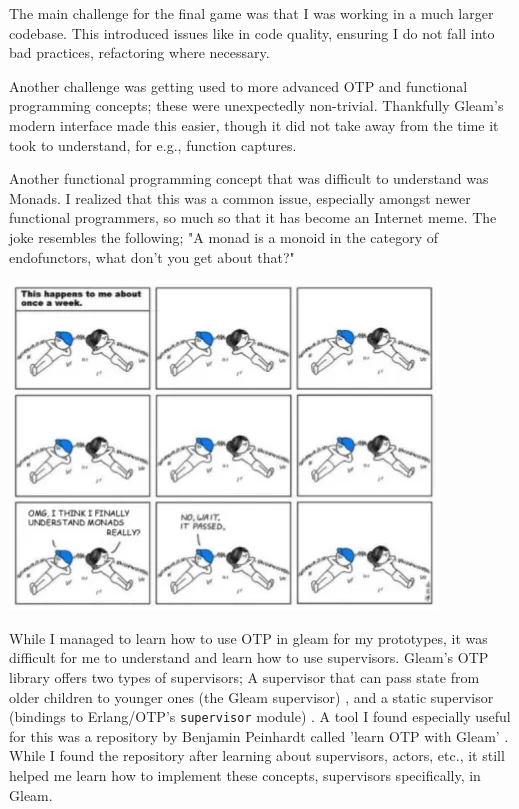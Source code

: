 \documentclass[]{final}
\begin{document}
The main challenge for the final game was that I was working in a much larger
codebase. This introduced issues like in code quality, ensuring I do not fall
into bad practices, refactoring where necessary. %

Another challenge was getting used to more advanced OTP and functional
programming concepts; these were unexpectedly non-trivial.
Thankfully Gleam's modern interface made this easier, though it did not take
away from the time it took to understand, for e.g., function captures.

\begin{minipage}[t]{18em}
  Another functional programming concept that was difficult to understand was Monads.
  I realized that this was a common issue, especially amongst newer functional programmers,
  so much so that it has become an Internet meme. The joke resembles the following;
  "A monad is a monoid in the category of endofunctors, what don't you get about that?"
\end{minipage}
\hfill
\begin{minipage}[t]{20em}
  \includegraphics[width=\linewidth]{monads.png}
  \label{fig: 20}
\end{minipage}

While I managed to learn how to use OTP in gleam for my prototypes, it was
difficult for me to understand and learn how to use supervisors. Gleam's OTP
library offers two types of supervisors; A supervisor that can pass state from
older children to younger ones (the Gleam supervisor) \cite{noauthor_gleam/otp/supervisor_nodate},
and a static supervisor (bindings to Erlang/OTP’s \lstinline|supervisor| module) \cite{noauthor_gleam/otp/static_supervisor_nodate}.
A tool I found especially useful for this was a repository by Benjamin Peinhardt called 'learn OTP with Gleam' \cite{peinhardt_bcpeinhardt/learn_otp_with_gleam_2025}.
While I found the repository after learning about supervisors, actors, etc.,
it still helped me learn how to implement these concepts, supervisors
specifically, in Gleam.
\end{document}
